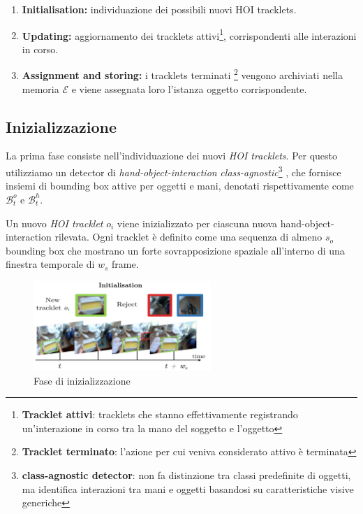\begin{enumerate}
    \item \textbf{Initialisation:} individuazione dei possibili nuovi HOI tracklets.
    \item \textbf{Updating:} aggiornamento dei tracklets attivi\footnote{\textbf{Tracklet attivi}: tracklets che stanno effettivamente registrando un’interazione in corso tra la mano del soggetto e l’oggetto}, corrispondenti alle interazioni in corso.
    \item \textbf{Assignment and storing:} i tracklets terminati \footnote{\textbf{Tracklet terminato}: l’azione per cui veniva considerato attivo è terminata} vengono archiviati nella memoria $\mathcal{E}$ e viene assegnata loro l’istanza oggetto corrispondente.
\end{enumerate}


\subsection*{Inizializzazione}
La prima fase consiste nell’individuazione dei nuovi \emph{HOI tracklets}. Per questo utilizziamo un detector di \emph{hand-object-interaction} \emph{class-agnostic}\footnote{\textbf{class-agnostic detector}: non fa distinzione tra classi predefinite di oggetti, ma identifica interazioni tra mani e oggetti basandosi su caratteristiche visive generiche} \cite{shan2020understandinghumanhandscontact}, che fornisce insiemi di bounding box attive per oggetti e mani, denotati rispettivamente come $\mathcal{B}_t^o$ e $\mathcal{B}_t^h$.

Un nuovo \emph{HOI tracklet} $o_i$ viene inizializzato per ciascuna nuova hand-object-interaction rilevata. Ogni tracklet è definito come una sequenza di almeno $s_o$ bounding box che mostrano un forte sovrapposizione spaziale all’interno di una finestra temporale di $w_s$ frame.

\begin{figure}[ht]
    \centering
    \includegraphics[width=0.6\textwidth]{Images/init.png}
    \caption{Fase di inizializzazione}
    \label{fig:init}
\end{figure}

